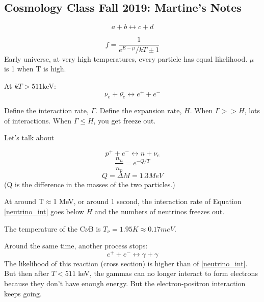 \documentclass[\main/main.tex]{subfiles}
\begin{document}
    \subsection{Cosmology Class Fall 2019: Martine's Notes}
    
    \par
    \begin{equation}
        a + b \leftrightarrow c + d
    \end{equation}
    
    \begin{equation}
        f = \frac{1}{e^{E-\mu}/kT \pm 1}
    \end{equation}
    Early universe, at very high temperatures, every particle has equal likelihood. $\mu$ is 1 when T is high.
    
    At $kT>511$keV:
    \begin{equation}\label{neutrino_int}
        \nu_e + \bar{\nu_e} \leftrightarrow e^+ + e^-
    \end{equation}
    
    Define the interaction rate, $\Gamma$. Define the expansion rate, $H$. When $\Gamma >> H$, lots of interactions. When $\Gamma \leq H$, you get freeze out.
    
    Let's talk about
    
    \begin{equation}
        p^+ + e^- \leftrightarrow n + \nu_e
    \end{equation}
    \begin{equation}
        \frac{n_n}{n_p} = e^{-Q/T}
    \end{equation}
    \begin{equation}
        Q = \Delta M = 1.3 MeV
    \end{equation}
    (Q is the difference in the masses of the two particles.)
    
    At around T$\approx$1 MeV, or around 1 second, the interaction rate of Equation \ref{neutrino_int} goes below $H$ and the numbers of neutrinos freezes out.
    
    The temperature of the C$\nu$B is $T_{\nu} = 1.95K \approx 0.17 meV$.
    
    Around the same time, another process stops:
    \begin{equation}
        e^+ +  e^- \leftrightarrow \gamma + \gamma
    \end{equation}
    The likelihood of this reaction (cross section) is higher than of \ref{neutrino_int}. But then after $T < 511$ keV, the gammas can no longer interact to form electrons because they don't have enough energy. But the electron-positron interaction keeps going. 
    
\end{document}
